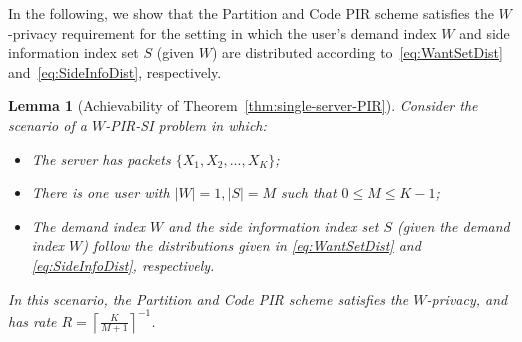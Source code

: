 \documentclass[letterpaper, 10 pt, conference]{ieeeconf}
\newtheorem{lemma}{Lemma}
\begin{document}

In the following, we show that the Partition and Code PIR scheme satisfies the $W$-privacy requirement for the setting in which the user's demand index $W$ and side information index set $S$ (given $W$) are distributed according to~\eqref{eq:WantSetDist} and~\eqref{eq:SideInfoDist}, respectively.

\begin{lemma}[Achievability of Theorem~\ref{thm:single-server-PIR}]
\label{lem:WPIRAch-NonDivis}
Consider the scenario of a $W$-PIR-SI problem in which:
\begin{itemize}
\item The server has packets $\{X_1,X_2,...,X_K\}$;
\item There is one user with $|W|=1,|S|=M$ such that $0\leq M\leq K-1$;
\item The demand index $W$ and the side information index set $S$ (given the demand index $W$) follow the distributions given in \eqref{eq:WantSetDist} and \eqref{eq:SideInfoDist}, respectively.
\end{itemize}
In this scenario, the Partition and Code PIR scheme satisfies the $W$-privacy, and has rate $R = \left\lceil \frac{K}{M+1} \right\rceil^{-1}$.
\end{lemma}
\end{document}
